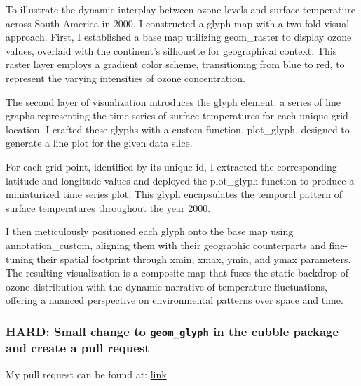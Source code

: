 \documentclass[
  letterpaper,
  DIV=11,
  numbers=noendperiod]{scrartcl}
\begin{document}
To illustrate the dynamic interplay between ozone levels and surface
temperature across South America in 2000, I constructed a glyph map with
a two-fold visual approach. First, I established a base map utilizing
geom\_raster to display ozone values, overlaid with the continent's
silhouette for geographical context. This raster layer employs a
gradient color scheme, transitioning from blue to red, to represent the
varying intensities of ozone concentration.

The second layer of visualization introduces the glyph element: a series
of line graphs representing the time series of surface temperatures for
each unique grid location. I crafted these glyphs with a custom
function, plot\_glyph, designed to generate a line plot for the given
data slice.

For each grid point, identified by its unique id, I extracted the
corresponding latitude and longitude values and deployed the plot\_glyph
function to produce a miniaturized time series plot. This glyph
encapsulates the temporal pattern of surface temperatures throughout the
year 2000.

I then meticulously positioned each glyph onto the base map using
annotation\_custom, aligning them with their geographic counterparts and
fine-tuning their spatial footprint through xmin, xmax, ymin, and ymax
parameters. The resulting visualization is a composite map that fuses
the static backdrop of ozone distribution with the dynamic narrative of
temperature fluctuations, offering a nuanced perspective on
environmental patterns over space and time.

\hypertarget{hard-small-change-to-geom_glyph-in-the-cubble-package-and-create-a-pull-request}{%
\subsubsection{\texorpdfstring{HARD: Small change to
\texttt{geom\_glyph} in the cubble package and create a pull
request}{HARD: Small change to geom\_glyph in the cubble package and create a pull request}}\label{hard-small-change-to-geom_glyph-in-the-cubble-package-and-create-a-pull-request}}

My pull request can be found at: \href{}{link}.
\end{document}
